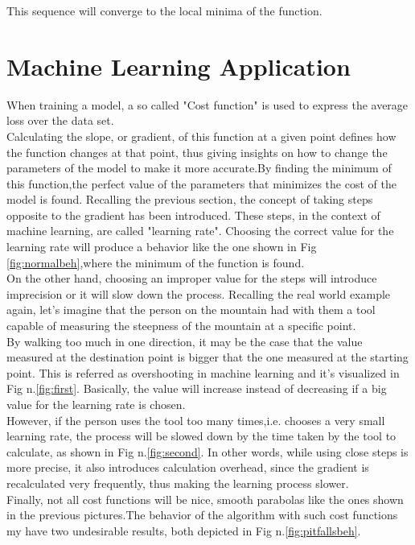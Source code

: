 \documentclass[conference]{IEEEtran}
\begin{document}
This sequence will converge to the local minima of the function.\cite{cau}

\section{Machine Learning Application}


When training a model, a so called "Cost function" is used to express the average loss over the data set.\\
Calculating the slope, or gradient, of this function at a given point defines how the function changes at that point, thus giving insights on how to change the parameters of the model to make it more accurate.By finding the minimum of this function,the perfect value of the parameters that minimizes the cost of the model is found. 
Recalling the previous section, the concept of taking steps opposite to the gradient has been introduced. These steps, in the context of machine learning, are called "learning rate".
Choosing the correct value for the learning rate will produce a behavior like the one shown in Fig \ref{fig:normalbeh},where the minimum of the function is found. \\
On the other hand, choosing an improper value for the steps will introduce imprecision or it will slow down the process.
Recalling the real world example again, let's imagine that the person on the mountain had with them a tool capable of measuring the steepness of the mountain at a specific point. \\
By walking too much in one direction, it may be the case that the value measured at the destination point is bigger that the one measured at the starting point. This is referred as overshooting in machine learning and it's visualized in Fig n.\ref{fig:first}. Basically, the value will increase instead of decreasing if a big value for the learning rate is chosen.\\
However, if the person uses the tool too many times,i.e. chooses a very small learning rate, the process will be slowed down by the time taken by the tool to calculate, as shown in Fig n.\ref{fig:second}. In other words, while using close steps is more precise, it also introduces calculation overhead, since the gradient is recalculated very frequently, thus making the learning process slower. \cite{Scikit-Learn}\\
Finally, not all cost functions will be nice, smooth parabolas like the ones shown in the previous pictures.The behavior of the algorithm with such cost functions my have two undesirable results, both depicted in Fig n.\ref{fig:pitfallsbeh}. 
\end{document}
